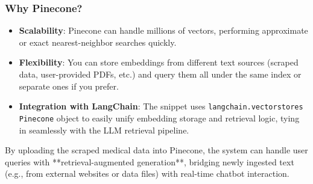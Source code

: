 \subsubsection*{Why Pinecone?}
\begin{itemize}
    \item \textbf{Scalability}:
    Pinecone can handle millions of vectors, performing approximate or exact nearest-neighbor searches quickly.  
    \item \textbf{Flexibility}:
    You can store embeddings from different text sources (scraped data, user-provided PDFs, etc.) and query them all under the same index or separate ones if you prefer.  
    \item \textbf{Integration with LangChain}:
    The snippet uses \texttt{langchain.vectorstores} \texttt{Pinecone} object to easily unify embedding storage and retrieval logic, tying in seamlessly with the LLM retrieval pipeline.
\end{itemize}

\noindent
By uploading the scraped medical data into Pinecone, the system can handle user queries with **retrieval-augmented generation**, bridging newly ingested text (e.g., from external websites or data files) with real-time chatbot interaction.
